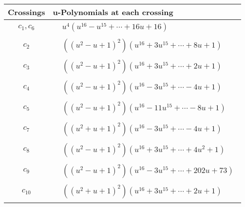 \documentclass[1p]{elsarticle_modified}
\theoremstyle{definition}
\begin{document}
\begin{tabular}{m{50pt}|m{274pt}}
Crossings & \hspace{64pt}u-Polynomials at each crossing \\
\hline $$\begin{aligned}c_{1},c_{6}\end{aligned}$$&$\begin{aligned}
&u^4(u^{16}- u^{15}+\cdots+16 u+16)
\end{aligned}$\\
\hline $$\begin{aligned}c_{2}\end{aligned}$$&$\begin{aligned}
&((u^2- u+1)^2)(u^{16}+3 u^{15}+\cdots+8 u+1)
\end{aligned}$\\
\hline $$\begin{aligned}c_{3}\end{aligned}$$&$\begin{aligned}
&((u^2- u+1)^2)(u^{16}+3 u^{15}+\cdots+2 u+1)
\end{aligned}$\\
\hline $$\begin{aligned}c_{4}\end{aligned}$$&$\begin{aligned}
&((u^2- u+1)^2)(u^{16}-3 u^{15}+\cdots-4 u+1)
\end{aligned}$\\
\hline $$\begin{aligned}c_{5}\end{aligned}$$&$\begin{aligned}
&((u^2- u+1)^2)(u^{16}-11 u^{15}+\cdots-8 u+1)
\end{aligned}$\\
\hline $$\begin{aligned}c_{7}\end{aligned}$$&$\begin{aligned}
&((u^2+u+1)^2)(u^{16}-3 u^{15}+\cdots-4 u+1)
\end{aligned}$\\
\hline $$\begin{aligned}c_{8}\end{aligned}$$&$\begin{aligned}
&((u^2- u+1)^2)(u^{16}+3 u^{15}+\cdots+4 u^2+1)
\end{aligned}$\\
\hline $$\begin{aligned}c_{9}\end{aligned}$$&$\begin{aligned}
&((u^2- u+1)^2)(u^{16}-3 u^{15}+\cdots+202 u+73)
\end{aligned}$\\
\hline $$\begin{aligned}c_{10}\end{aligned}$$&$\begin{aligned}
&((u^2+u+1)^2)(u^{16}+3 u^{15}+\cdots+2 u+1)
\end{aligned}$\\
\hline
\end{tabular}\newpage\renewcommand{\arraystretch}{1}
\end{document}
